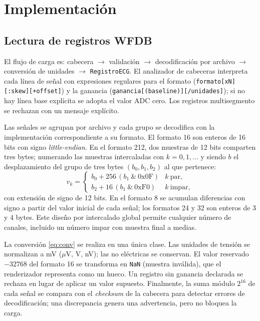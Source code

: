 \section{Implementación}
\subsection{Lectura de registros WFDB}
El flujo de carga es: cabecera $\rightarrow$ validación $\rightarrow$ decodificación por archivo $\rightarrow$ conversión de unidades $\rightarrow$ \texttt{RegistroECG}. El analizador de cabeceras interpreta cada línea de señal con expresiones regulares para el formato (\texttt{formato[xN][:skew][+offset]}) y la ganancia (\texttt{ganancia[(baseline)][/unidades]}); si no hay línea base explícita se adopta el valor ADC cero. Los registros multisegmento se rechazan con un mensaje explícito.

Las señales se agrupan por archivo y cada grupo se decodifica con la implementación correspondiente a su formato. El formato 16 son enteros de 16 bits con signo \emph{little-endian}. En el formato 212, dos muestras de 12 bits comparten tres bytes; numerando las muestras intercaladas con $k=0,1,\dots$ y siendo $b$ el desplazamiento del grupo de tres bytes $(b_0,b_1,b_2)$ al que pertenece:
\begin{equation}
v_k=\begin{cases}
b_0+256\,(b_1\ \&\ \mathrm{0x0F}) & k\ \text{par},\\
b_2+16\,(b_1\ \&\ \mathrm{0xF0}) & k\ \text{impar},
\end{cases}
\end{equation}
con extensión de signo de 12 bits. En el formato 8 se acumulan diferencias con signo a partir del valor inicial de cada señal; los formatos 24 y 32 son enteros de 3 y 4 bytes. Este diseño por intercalado global permite cualquier número de canales, incluido un número impar con muestra final a medias.

La conversión \eqref{eq:conv} se realiza en una única clase. Las unidades de tensión se normalizan a mV ($\mu$V, V, nV); las no eléctricas se conservan. El valor reservado $-32768$ del formato 16 se transforma en \texttt{NaN} (muestra inválida), que el renderizador representa como un hueco. Un registro sin ganancia declarada se rechaza en lugar de aplicar un valor supuesto. Finalmente, la suma módulo $2^{16}$ de cada señal se compara con el \emph{checksum} de la cabecera para detectar errores de decodificación; una discrepancia genera una advertencia, pero no bloquea la carga.


